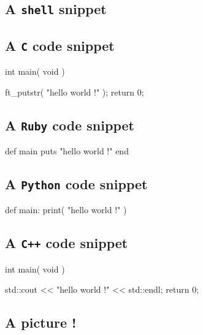 \documentclass{42-en}
\begin{document}
        \subsection{A \texttt{shell} snippet}


        \subsection{A \texttt{C} code snippet}

           \begin{42ccode}
int main( void ) {

    ft_putstr( "hello world !" );
    return 0;
}
\end{42ccode}

        \subsection{A \texttt{Ruby} code snippet}

           \begin{42rbcode}
def main
    puts "hello world !"
end
\end{42rbcode}

        \subsection{A \texttt{Python} code snippet}

           \begin{42pycode}
def main:
    print( "hello world !" )
\end{42pycode}

        \subsection{A \texttt{C++} code snippet}

            \begin{42cppcode}
int main( void ) {

    std::cout << "hello world !" << std::endl;
    return 0;
}
\end{42cppcode}


        \subsection{A picture !}
\end{document}
